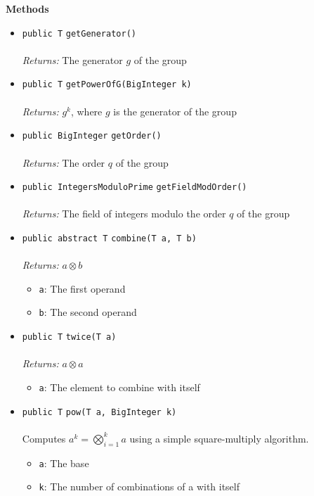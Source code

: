 \textbf{\sffamily Methods}
\begin{itemize}
\item \lstinline|public T| \lstinline|getGenerator|\lstinline|()|\\ \\[-0.6em]
\emph{Returns:} The generator $g$ of the group



\item \lstinline|public T| \lstinline|getPowerOfG|\lstinline|(BigInteger k)|\\ \\[-0.6em]
\emph{Returns:} $g^k$, where $g$ is the generator of the group



\item \lstinline|public BigInteger| \lstinline|getOrder|\lstinline|()|\\ \\[-0.6em]
\emph{Returns:} The order $q$ of the group



\item \lstinline|public IntegersModuloPrime| \lstinline|getFieldModOrder|\lstinline|()|\\ \\[-0.6em]
\emph{Returns:} The field of integers modulo the order $q$ of the group



\item \lstinline|public abstract T| \lstinline|combine|\lstinline|(T a, T b)|\\ \\[-0.6em]
\emph{Returns:} $a \otimes b$
\begin{itemize}
\item \lstinline|a|: The first operand
\item \lstinline|b|: The second operand
\end{itemize}



\item \lstinline|public T| \lstinline|twice|\lstinline|(T a)|\\ \\[-0.6em]
\emph{Returns:} $a \otimes a$
\begin{itemize}
\item \lstinline|a|: The element to combine with itself
\end{itemize}



\item \lstinline|public T| \lstinline|pow|\lstinline|(T a, BigInteger k)|\\ \\[-0.6em]
Computes $a^k = \bigotimes_{i=1}^{k} a$ using a simple
 square-multiply algorithm.
\begin{itemize}
\item \lstinline|a|: The base
\item \lstinline|k|: The number of combinations of a with itself
\end{itemize}


\end{itemize}
